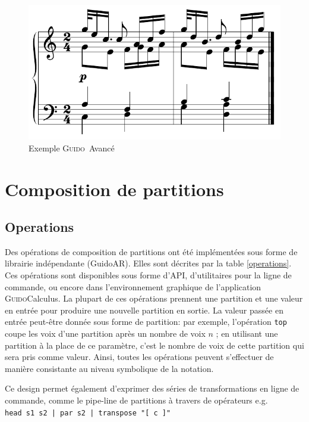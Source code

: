 \documentclass{article}
\newcommand{\Guido}		{\textsc{Guido}}
\newcommand{\GAR}			{GuidoAR}
\newcommand{\code}[1]		{{\small \texttt{#1}}}
\begin{document}
\begin{figure}[h]
	\centering \includegraphics[width=0.85\columnwidth]{rsrc/4voices}
 \caption{Exemple \Guido\ Avancé}
 \label{advex}
\end{figure}



\section{Composition de partitions}
\subsection{Operations}
Des opérations de composition de partitions ont été implémentées sous forme de librairie indépendante (\GAR ). Elles sont décrites par la table  \ref{operations}. Ces opérations sont disponibles sous forme d'API, d'utilitaires pour la ligne de commande, ou encore dans l'environnement graphique de l'application \Guido Calculus.
La plupart de ces opérations prennent une partition et une valeur en entrée pour produire une nouvelle partition en sortie. La valeur passée en entrée peut-être donnée sous forme de partition: par exemple, l'opération  \code{top} coupe les voix d'une partition après un nombre de voix $n$ ; en utilisant une partition à la place de ce paramètre, c'est le nombre de voix de cette partition qui sera pris comme valeur.
Ainsi, toutes les opérations peuvent s'effectuer de manière consistante au niveau symbolique de la notation. 

Ce design permet également d'exprimer des séries de transformations en ligne de commande, comme le pipe-line de partitions à travers de opérateurs e.g. \\
\hspace*{4mm} \code{head s1 s2 | par s2 | transpose "[ c ]" }
\end{document}
